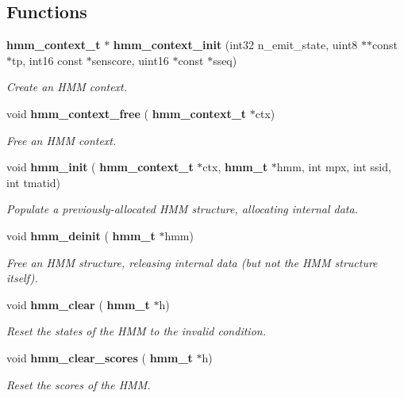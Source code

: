 \subsection*{Functions}
\begin{DoxyCompactItemize}
\item 
\mbox{\label{hmm_8h_a4d6e2799cbe290112e8517adcab1b038}} 
\textbf{ hmm\+\_\+context\+\_\+t} $\ast$ \textbf{ hmm\+\_\+context\+\_\+init} (int32 n\+\_\+emit\+\_\+state, uint8 $\ast$$\ast$const $\ast$tp, int16 const $\ast$senscore, uint16 $\ast$const $\ast$sseq)
\begin{DoxyCompactList}\small\item\em Create an H\+MM context. \end{DoxyCompactList}\item 
void \textbf{ hmm\+\_\+context\+\_\+free} (\textbf{ hmm\+\_\+context\+\_\+t} $\ast$ctx)
\begin{DoxyCompactList}\small\item\em Free an H\+MM context. \end{DoxyCompactList}\item 
\mbox{\label{hmm_8h_aa911ae0d1c0eba562692fbeebca90d78}} 
void \textbf{ hmm\+\_\+init} (\textbf{ hmm\+\_\+context\+\_\+t} $\ast$ctx, \textbf{ hmm\+\_\+t} $\ast$hmm, int mpx, int ssid, int tmatid)
\begin{DoxyCompactList}\small\item\em Populate a previously-\/allocated H\+MM structure, allocating internal data. \end{DoxyCompactList}\item 
\mbox{\label{hmm_8h_a7440ced1649225beb6816bf62481e08b}} 
void \textbf{ hmm\+\_\+deinit} (\textbf{ hmm\+\_\+t} $\ast$hmm)
\begin{DoxyCompactList}\small\item\em Free an H\+MM structure, releasing internal data (but not the H\+MM structure itself). \end{DoxyCompactList}\item 
void \textbf{ hmm\+\_\+clear} (\textbf{ hmm\+\_\+t} $\ast$h)
\begin{DoxyCompactList}\small\item\em Reset the states of the H\+MM to the invalid condition. \end{DoxyCompactList}\item 
\mbox{\label{hmm_8h_a9561d7ffa1e61c99de2d2b900774152f}} 
void \textbf{ hmm\+\_\+clear\+\_\+scores} (\textbf{ hmm\+\_\+t} $\ast$h)
\begin{DoxyCompactList}\small\item\em Reset the scores of the H\+MM. \end{DoxyCompactList}\item 
$$
\end{DoxyCompactItemize}
